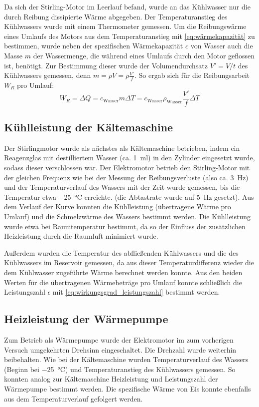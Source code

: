 Da sich der Stirling-Motor im Leerlauf befand, wurde an das Kühlwasser nur die durch Reibung dissipierte Wärme abgegeben. Der Temperaturanstieg des Kühlwassers wurde mit einem Thermometer gemessen. Um die Reibungswärme eines Umlaufs des Motors aus dem Temperaturanstieg mit \cref{eq:wärmekapazität} zu bestimmen, wurde neben der spezifischen Wärmekapazität $c$ von Wasser auch die Masse $m$ der Wassermenge, die während eines Umlaufs durch den Motor geflossen ist, benötigt. Zur Bestimmung dieser wurde der Volumendurchsatz $V' = V/t$ des Kühlwassers gemessen, denn $m = \rho V = \rho \frac{V'}{f}$. So ergab sich für die Reibungsarbeit $W_R$ pro Umlauf:
\begin{equation}\label{eq:reibungsarbeit}
W_R = \Delta Q = c_\text{Wasser} m \Delta T
= c_\text{Wasser} \rho_\text{Wasser} \frac{V'}{f} \Delta T
\end{equation}

\subsection{Kühlleistung der Kältemaschine}
Der Stirlingmotor wurde als nächstes als Kältemaschine betrieben, indem ein Reagenzglas mit destilliertem Wasser (ca. \SI{1}{\ml}) in den Zylinder eingesetzt wurde, sodass dieser verschlossen war. Der Elektromotor betrieb den Stirling-Motor mit der gleichen Frequenz wie bei der Messung der Reibungsverluste (also ca. \SI{3}{\Hz}) und der Temperaturverlauf des Wassers mit der Zeit wurde gemessen, bis die Temperatur etwa \SI{-25}{\celsius} erreichte. (die Abtastrate wurde auf \SI{5}{\Hz} gesetzt). Aus dem Verlauf der Kurve konnten die Kühlleistung (übertragene Wärme pro Umlauf) und die Schmelzwärme des Wassers bestimmt werden. Die Kühlleistung wurde etwa bei Raumtemperatur bestimmt, da so der Einfluss der zusätzlichen Heizleistung durch die Raumluft minimiert wurde.

Außerdem wurden die Temperatur des abfließenden Kühlwassers und die des Kühlwassers im Reservoir gemessen, da aus dieser Temperaturdifferenz wieder die dem Kühlwasser zugeführte Wärme berechnet werden konnte. Aus den beiden Werten für die übertragenen Wärmebeträge pro Umlauf konnte schließlich die Leistungszahl $\epsilon$ mit \cref{eq:wirkungsgrad_leistungszahl} bestimmt werden.

\subsection{Heizleistung der Wärmepumpe}
Zum Betrieb als Wärmepumpe wurde der Elektromotor im zum vorherigen Versuch umgekehrten Drehsinn eingeschaltet. Die Drehzahl wurde weiterhin beibehalten. Wie bei der Kältemaschine wurden Temperaturverlauf des Wassers (Beginn bei \SI{-25}{\celsius}) und Temperaturanstieg des Kühlwassers gemessen. So konnten analog zur Kältemaschine Heizleistung und Leistungszahl der Wärmepumpe bestimmt werden. Die spezifische Wärme von Eis konnte ebenfalls aus dem Temperaturverlauf gefolgert werden.

